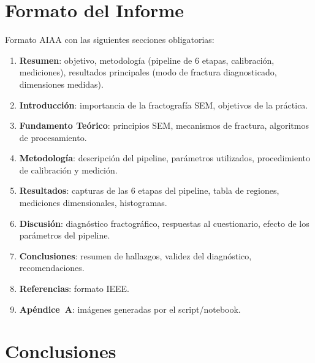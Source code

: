\documentclass[12pt,a4paper]{article}
\begin{document}
\section{Formato del Informe}
\label{sec:informe}

Formato AIAA con las siguientes secciones obligatorias:

\begin{enumerate}
	\item \textbf{Resumen}: objetivo, metodología (pipeline de 6 etapas,
	      calibración, mediciones), resultados principales (modo de fractura
	      diagnosticado, dimensiones medidas).
	\item \textbf{Introducción}: importancia de la fractografía SEM,
	      objetivos de la práctica.
	\item \textbf{Fundamento Teórico}: principios SEM, mecanismos de
	      fractura, algoritmos de procesamiento.
	\item \textbf{Metodología}: descripción del pipeline, parámetros
	      utilizados, procedimiento de calibración y medición.
	\item \textbf{Resultados}: capturas de las 6 etapas del pipeline,
	      tabla de regiones, mediciones dimensionales, histogramas.
	\item \textbf{Discusión}: diagnóstico fractográfico, respuestas al
	      cuestionario, efecto de los parámetros del pipeline.
	\item \textbf{Conclusiones}: resumen de hallazgos, validez del
	      diagnóstico, recomendaciones.
	\item \textbf{Referencias}: formato IEEE.
	\item \textbf{Apéndice~A}: imágenes generadas por el script/notebook.
\end{enumerate}

\section{Conclusiones}
\label{sec:conclusiones}
\end{document}
